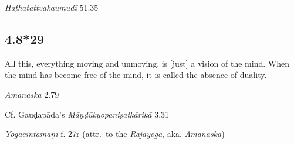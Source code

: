 \begin{ekdosis}

\begin{testimonia}[hp04_008_28]
\emph{Haṭhatattvakaumudī} 51.35
\begin{versinnote}
\end{versinnote}
\end{testimonia}


\subsection*{4.8*29}
\begin{translation}[hp04_008_29]
All this, everything moving and unmoving, is [just] a vision of the mind. When the mind has become free of the mind, it is called the absence of duality.
\end{translation}

\begin{sources}[hp04_008_29]
\emph{Amanaska} 2.79
\begin{versinnote}
\end{versinnote}

Cf. Gauḍapāda's \emph{Māṇḍūkyopaniṣatkārikā} 3.31
\begin{versinnote}
\end{versinnote}

\end{sources}

\begin{testimonia}[hp04_008_29]
\emph{Yogacintāmaṇi} f. 27r (attr.~to the \emph{Rājayoga}, aka. \emph{Amanaska})
\begin{versinnote}
\end{versinnote}
\end{testimonia}


\end{ekdosis}

